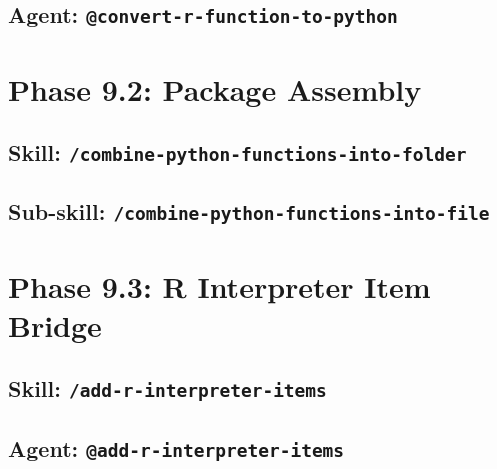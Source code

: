 \documentclass[12pt]{article}
\begin{document}


\subsection{Agent: \texttt{@convert-r-function-to-python}}
\label{app:agent:convert-r-function-to-python}



\section{Phase 9.2: Package Assembly}
\label{app:phase9.2}

\subsection{Skill: \texttt{/combine-python-functions-into-folder}}
\label{app:skill:combine-python-functions-into-folder}



\subsection{Sub-skill: \texttt{/combine-python-functions-into-file}}
\label{app:skill:combine-python-functions-into-file}



\section{Phase 9.3: R Interpreter Item Bridge}
\label{app:phase9.3}

\subsection{Skill: \texttt{/add-r-interpreter-items}}
\label{app:skill:add-r-interpreter-items}



\subsection{Agent: \texttt{@add-r-interpreter-items}}
\label{app:agent:add-r-interpreter-items}
\end{document}
